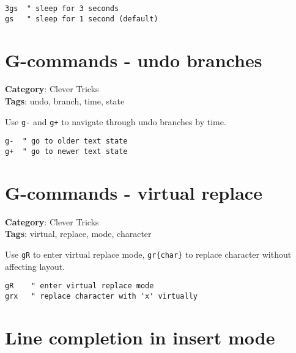 {{{\begin{Exa*}{}
\begin{Verbatim}[fontsize=\footnotesize, breaklines, breakanywhere]
3gs  " sleep for 3 seconds
gs   " sleep for 1 second (default)
\end{Verbatim}
\end{Exa*}

\section{G-commands - undo branches}

\textbf{Category}: Clever Tricks\\ \textbf{Tags}: undo, branch, time, state
\vspace{0.5cm}

Use {\footnotesize \Verb§g-§} and {\footnotesize \Verb§g+§} to navigate through undo branches by time.

\begin{Exa*}{}
\begin{Verbatim}[fontsize=\footnotesize, breaklines, breakanywhere]
g-  " go to older text state
g+  " go to newer text state
\end{Verbatim}
\end{Exa*}

\section{G-commands - virtual replace}

\textbf{Category}: Clever Tricks\\ \textbf{Tags}: virtual, replace, mode, character
\vspace{0.5cm}

Use {\footnotesize \Verb§gR§} to enter virtual replace mode, {\footnotesize \Verb§gr{char}§} to replace character without affecting layout.

\begin{Exa*}{}
\begin{Verbatim}[fontsize=\footnotesize, breaklines, breakanywhere]
gR    " enter virtual replace mode
grx   " replace character with 'x' virtually
\end{Verbatim}
\end{Exa*}

\section{Line completion in insert mode}

}}}
